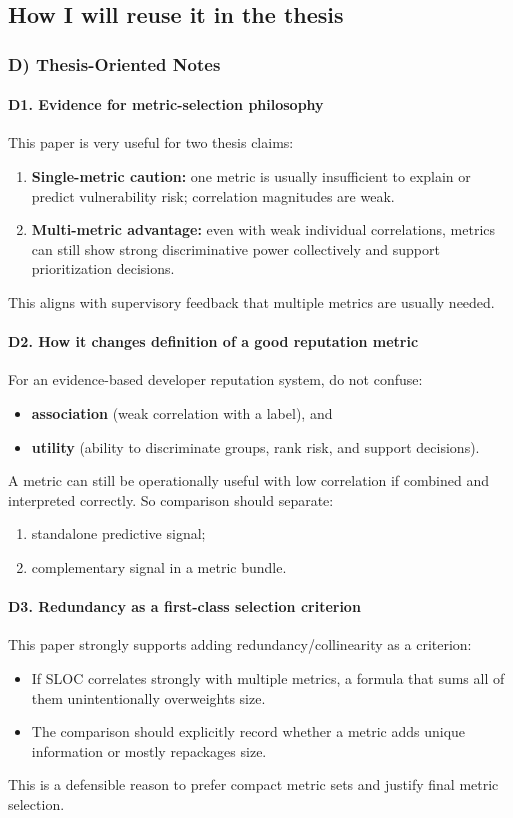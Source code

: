\documentclass[11pt,a4paper]{article}
\begin{document}
\subsection{How I will reuse it in the thesis}
\subsubsection*{D) Thesis-Oriented Notes}
\paragraph{D1. Evidence for metric-selection philosophy}
This paper is very useful for two thesis claims:
\begin{enumerate}[leftmargin=*]
  \item \textbf{Single-metric caution:} one metric is usually insufficient to explain or predict vulnerability risk; correlation magnitudes are weak.
  \item \textbf{Multi-metric advantage:} even with weak individual correlations, metrics can still show strong discriminative power collectively and support prioritization decisions.
\end{enumerate}
This aligns with supervisory feedback that multiple metrics are usually needed.

\paragraph{D2. How it changes definition of a good reputation metric}
For an evidence-based developer reputation system, do not confuse:
\begin{itemize}[leftmargin=*]
  \item \textbf{association} (weak correlation with a label), and
  \item \textbf{utility} (ability to discriminate groups, rank risk, and support decisions).
\end{itemize}
A metric can still be operationally useful with low correlation if combined and interpreted correctly. So comparison should separate:
\begin{enumerate}[leftmargin=*]
  \item standalone predictive signal;
  \item complementary signal in a metric bundle.
\end{enumerate}

\paragraph{D3. Redundancy as a first-class selection criterion}
This paper strongly supports adding redundancy/collinearity as a criterion:
\begin{itemize}[leftmargin=*]
  \item If SLOC correlates strongly with multiple metrics, a formula that sums all of them unintentionally overweights size.
  \item The comparison should explicitly record whether a metric adds unique information or mostly repackages size.
\end{itemize}
This is a defensible reason to prefer compact metric sets and justify final metric selection.
\end{document}
